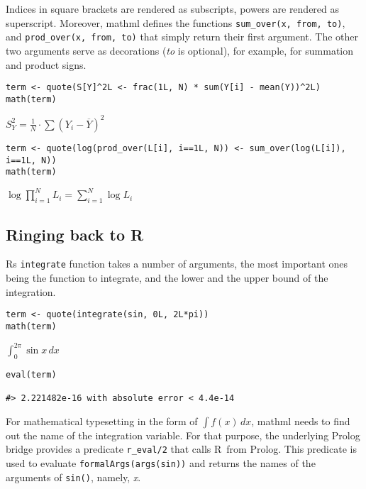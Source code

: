 Indices in square brackets are rendered as subscripts, powers are
rendered as superscript. Moreover, mathml defines the functions
\texttt{sum\_over(x,~from,~to)}, and \texttt{prod\_over(x,~from,~to)} that simply return
their first argument. The other two arguments serve as decorations (\emph{to}
is optional), for example, for summation and product signs.

\begin{verbatim}
term <- quote(S[Y]^2L <- frac(1L, N) * sum(Y[i] - mean(Y))^2L)
math(term)
\end{verbatim}

\({{S}_{Y}^{2}}{=}{{\frac{1}{N}}{\cdot}{{\sum{\left({{Y}_{i}}{-}{\overline{Y}}\right)}}^{2}}}\)

\begin{verbatim}
term <- quote(log(prod_over(L[i], i==1L, N)) <- sum_over(log(L[i]), i==1L, N))
math(term)
\end{verbatim}

\({\log{{\prod}_{{i}{=}{1}}^{N}{{L}_{i}}}}{=}{{\sum}_{{i}{=}{1}}^{N}{\log{{L}_{i}}}}\)

\hypertarget{ringing-back-to-r}{%
\subsection{Ringing back to R}\label{ringing-back-to-r}}

Rs \texttt{integrate} function takes a number of arguments, the most important
ones being the function to integrate, and the lower and the upper bound
of the integration.

\begin{verbatim}
term <- quote(integrate(sin, 0L, 2L*pi))
math(term)
\end{verbatim}

\(\int_{0}^{{2}{{}}{\pi}}{\sin{x}}\,{d{x}}\)

\begin{verbatim}
eval(term)

#> 2.221482e-16 with absolute error < 4.4e-14
\end{verbatim}

For mathematical typesetting in the form of \(\int f(x)\, dx\), mathml
needs to find out the name of the integration variable. For that
purpose, the underlying Prolog bridge provides a predicate \texttt{r\_eval/2}
that calls R~from Prolog. This predicate is used to evaluate
\texttt{formalArgs(args(sin))} and returns the names of the arguments of
\texttt{sin()}, namely, \emph{x}.

